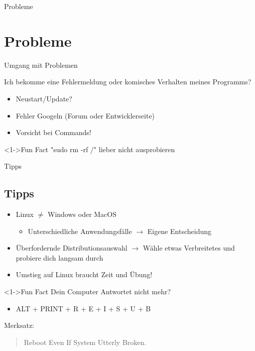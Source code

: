 
\begin{frame}{Probleme}
    \section{Probleme}\label{sec:probleme}

\end{frame}

\begin{frame}{Umgang mit Problemen}

    Ich bekomme eine Fehlermeldung oder komisches Verhalten meines Programms?

    \begin{itemize}
        \item<2-> Neustart/Update?
        \item<3-> Fehler Googeln (Forum oder Entwicklerseite)
        \item<4-> Vorsicht bei Commands!
    \end{itemize}

    \vspace{0.5cm}
    \begin{exampleblock}<1->{Fun Fact}
        "sudo rm -rf /" lieber nicht ausprobieren
    \end{exampleblock}

\end{frame}

\begin{frame}{Tipps}
    \subsection{Tipps}\label{subsec:tipps}

    \begin{itemize}
        \item<1-> Linux $\neq$ Windows oder MacOS
        \begin{itemize}
            \item <1-> Unterschiedliche Anwendungsfälle $\longrightarrow$ Eigene Entscheidung
        \end{itemize}
        \item<2-> Überfordernde Distributionsauswahl $\longrightarrow$ Wähle etwas Verbreitetes und probiere dich langsam durch
        \item<3-> Umstieg auf Linux braucht Zeit und Übung!
    \end{itemize}

    \vspace{0.5cm}
    \begin{exampleblock}<1->{Fun Fact}
        Dein Computer Antwortet nicht mehr?
        \begin{itemize}
            \item ALT + PRINT + R + E + I + S + U + B
        \end{itemize}
        Merksatz:
        \begin{quote}
            Reboot Even If System Utterly Broken.
        \end{quote}
    \end{exampleblock}

\end{frame}
